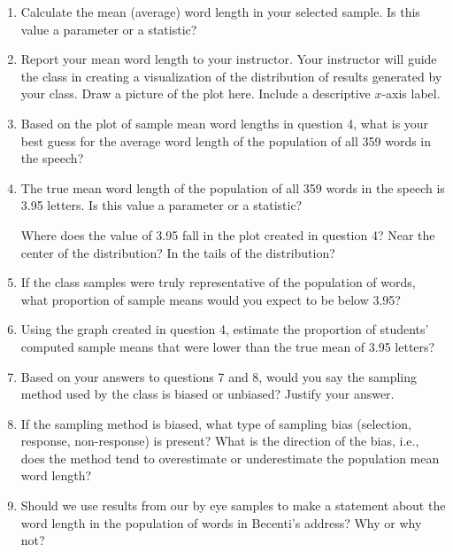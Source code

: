 \documentclass[
]{report}
\begin{document}
\begin{enumerate}
\def\labelenumi{\arabic{enumi}.}
\setcounter{enumi}{2}
\item
  Calculate the mean (average) word length in your selected sample. Is this value a parameter or a statistic?\\
  \vspace{0.3in}
\item
  Report your mean word length to your instructor. Your instructor will guide the class in creating a visualization of the distribution of results generated by your class. Draw a picture of the plot here. Include a descriptive \(x\)-axis label.
  \vspace{1.5in}
\item
  Based on the plot of sample mean word lengths in question 4, what is your best guess for the average word length of the population of all 359 words in the speech?
  \vspace{0.3in}
\item
  The true mean word length of the population of all 359 words in the speech is 3.95 letters. Is this value a parameter or a statistic?\\
  \vspace{0.2in}

  Where does the value of 3.95 fall in the plot created in question 4? Near the center of the distribution? In the tails of the distribution?
  \vspace{0.3in}
\item
  If the class samples were truly representative of the population of words, what proportion of sample means would you expect to be below 3.95?
  \vspace{0.5in}
\item
  Using the graph created in question 4, estimate the proportion of students' computed sample means that were lower than the true mean of 3.95 letters?
  \vspace{0.5in}
\item
  Based on your answers to questions 7 and 8, would you say the sampling method used by the class is biased or unbiased? Justify your answer.\\
  \vspace{0.5in}
\item
  If the sampling method is biased, what type of sampling bias (selection, response, non-response) is present? What is the direction of the bias, i.e., does the method tend to overestimate or underestimate the population mean word length?
  \vspace{0.5in}
\item
  Should we use results from our by eye samples to make a statement about the word length in the population of words in Becenti's address? Why or why not?
  \vspace{1in}
\end{enumerate}
\end{document}
